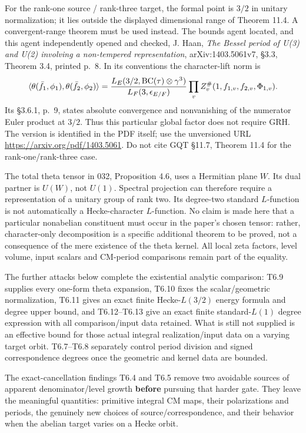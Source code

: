 \documentclass[11pt,a4paper]{article}
\theoremstyle{definition}
\begin{document}
For the rank-one source / rank-three target, the formal point is \(3/2\) in unitary normalization; it lies outside the displayed dimensional range of Theorem 11.4. A convergent-range theorem must be used instead. The bounds agent located, and this agent independently opened and checked, J. Haan, \emph{The Bessel period of U(3) and U(2) involving a non-tempered representation}, arXiv:1403.5061v7, §3.3, Theorem 3.4, printed p.~8. In its conventions the character-lift norm is \[
\langle\theta(\bar f_1,\phi_1),\theta(\bar f_2,\phi_2)\rangle
={L_E(3/2,\mathrm{BC}(\tau)\otimes\gamma^3)\over L_F(3,\epsilon_{E/F})}
\prod_v Z_v^\#(1,f_{1,v},f_{2,v},\Phi_{1,v}).
\] Its §3.6.1, p.~9, states absolute convergence and nonvanishing of the numerator Euler product at \(3/2\). Thus this particular global factor does not require GRH. The version is identified in the PDF itself; use the unversioned URL \url{https://arxiv.org/pdf/1403.5061}. Do not cite GQT §11.7, Theorem 11.4 for the rank-one/rank-three case.

The total theta tensor in 032, Proposition 4.6, uses a Hermitian plane \(W\). Its dual partner is \(U(W)\), not \(U(1)\). Spectral projection can therefore require a representation of a unitary group of rank two. Its degree-two standard \(L\)-function is not automatically a Hecke-character \(L\)-function. No claim is made here that a particular nonabelian constituent must occur in the paper's chosen tensor: rather, character-only decomposition is a specific additional theorem to be proved, not a consequence of the mere existence of the theta kernel. All local zeta factors, level volume, input scalars and CM-period comparisons remain part of the equality.

The further attacks below complete the existential analytic comparison: T6.9 supplies every one-form theta expansion, T6.10 fixes the scalar/geometric normalization, T6.11 gives an exact finite Hecke-\(L(3/2)\) energy formula and degree upper bound, and T6.12--T6.13 give an exact finite standard-\(L(1)\) degree expression with all comparison/input data retained. What is still not supplied is an effective bound for those actual integral realization/input data on a varying target orbit. T6.7--T6.8 separately control period division and signed correspondence degrees once the geometric and kernel data are bounded.

The exact-cancellation findings T6.4 and T6.5 remove two avoidable sources of apparent denominator/level growth \textbf{before} pursuing that harder gate. They leave the meaningful quantities: primitive integral CM maps, their polarizations and periods, the genuinely new choices of source/correspondence, and their behavior when the abelian target varies on a Hecke orbit.
\end{document}
